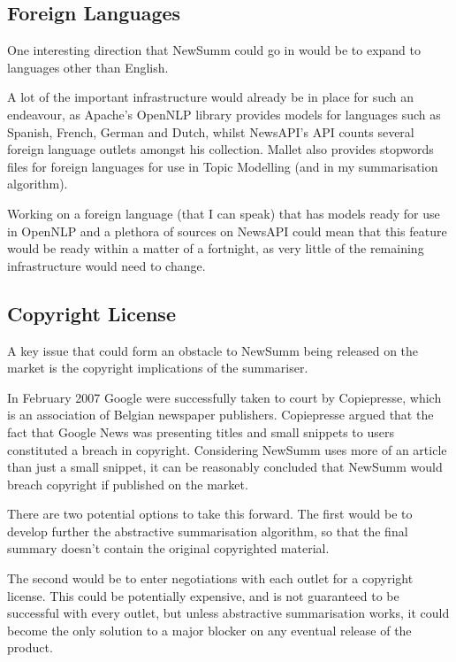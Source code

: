 \documentclass[12pt]{article}
\begin{document}
\subsection{Foreign Languages}

One interesting direction that NewSumm could go in would be to expand to languages other than English. 

A lot of the important infrastructure would already be in place for such an endeavour, as Apache's OpenNLP library provides models for languages such as Spanish, French, German and Dutch, whilst NewsAPI's API counts several foreign language outlets amongst his collection. Mallet also provides stopwords files for foreign languages for use in Topic Modelling (and in my summarisation algorithm).

Working on a foreign language (that I can speak) that has models ready for use in OpenNLP and a plethora of sources on NewsAPI could mean that this feature would be ready within a matter of a fortnight, as very little of the remaining infrastructure would need to change.

\subsection{Copyright License}

A key issue that could form an obstacle to NewSumm being released on the market is the copyright implications of the summariser. 

In February 2007 Google were successfully taken to court by Copiepresse, which is an association of Belgian newspaper publishers. Copiepresse argued that the fact that Google News was presenting titles and small snippets to users constituted a breach in copyright. Considering NewSumm uses more of an article than just a small snippet, it can be reasonably concluded that NewSumm would breach copyright if published on the market.

There are two potential options to take this forward. The first would be to develop further the abstractive summarisation algorithm, so that the final summary doesn't contain the original copyrighted material.

The second would be to enter negotiations with each outlet for a copyright license. This could be potentially expensive, and is not guaranteed to be successful with every outlet, but unless abstractive summarisation works, it could become the only solution to a major blocker on any eventual release of the product. 
\end{document}
